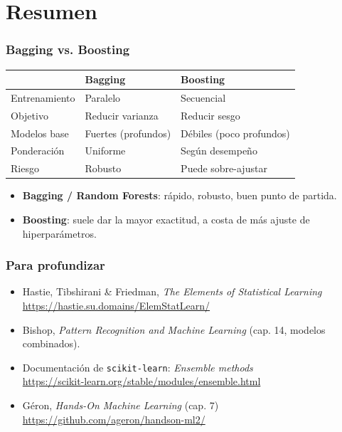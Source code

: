 \documentclass[aspectratio=169, 10pt]{beamer}
\begin{document}
\section{Resumen}
\begin{frame}
\frametitle{Bagging vs. Boosting}
\begin{center}
\begin{tabular}{lll}
\hline
 & \textbf{Bagging} & \textbf{Boosting}\\
\hline
Entrenamiento   & Paralelo            & Secuencial\\
Objetivo        & Reducir varianza    & Reducir sesgo\\
Modelos base    & Fuertes (profundos) & D\'ebiles (poco profundos)\\
Ponderaci\'on   & Uniforme            & Seg\'un desempe\~{n}o\\
Riesgo          & Robusto             & Puede sobre-ajustar\\
\hline
\end{tabular}
\end{center}
\vspace{1em}
\begin{itemize}
	\item \textbf{Bagging / Random Forests}: r\'apido, robusto, buen punto de partida.
	\item \textbf{Boosting}: suele dar la mayor exactitud, a costa de m\'as ajuste de hiperpar\'ametros.
\end{itemize}
\end{frame}

\begin{frame}
\frametitle{Para profundizar}
\begin{itemize}
	\item Hastie, Tibshirani \& Friedman, \emph{The Elements of Statistical Learning}\\ \url{https://hastie.su.domains/ElemStatLearn/}
	\item Bishop, \emph{Pattern Recognition and Machine Learning} (cap. 14, modelos combinados).
	\item Documentaci\'on de \texttt{scikit-learn}: \emph{Ensemble methods}\\ \url{https://scikit-learn.org/stable/modules/ensemble.html}
	\item G\'eron, \emph{Hands-On Machine Learning} (cap. 7)\\ \url{https://github.com/ageron/handson-ml2/}
\end{itemize}
\end{frame}
\end{document}
